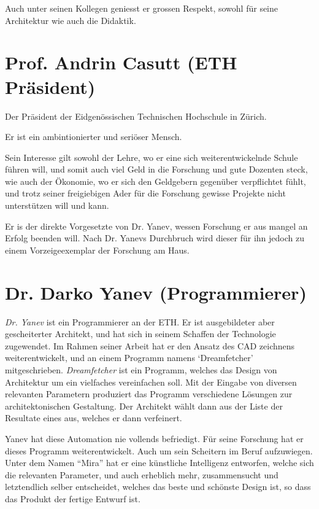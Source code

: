 \documentclass[11pt,a4paper,ngerman]{scrreprt}
\begin{document}
Auch unter seinen Kollegen geniesst er grossen Respekt, sowohl für seine
Architektur wie auch die Didaktik.

\section*{Prof. Andrin Casutt (ETH Präsident)}

Der Präsident der Eidgenössischen Technischen Hochschule in Zürich.

Er ist ein ambintionierter und seriöser Mensch.

Sein Interesse gilt sowohl der Lehre, wo er eine sich weiterentwickelnde Schule
führen will, und somit auch viel Geld in die Forschung und gute Dozenten steck,
wie auch der Ökonomie, wo er sich den Geldgebern gegenüber verpflichtet fühlt,
und trotz seiner freigiebigen Ader für die Forschung gewisse Projekte nicht
unterstützen will und kann.

Er is der direkte Vorgesetzte von Dr. Yanev, wessen Forschung er aus mangel an
Erfolg beenden will. Nach Dr. Yanevs Durchbruch wird dieser für ihn jedoch zu
einem Vorzeigeexemplar der Forschung am Haus.

\section*{Dr. Darko Yanev (Programmierer)}

\emph{Dr. Yanev} ist ein Programmierer an der ETH. Er ist ausgebildeter aber
gescheiterter Architekt, und hat sich in seinem Schaffen der Technologie
zugewendet. Im Rahmen seiner Arbeit hat er den Ansatz des CAD zeichnens
weiterentwickelt, und an einem Programm namens `Dreamfetcher'
mitgeschrieben. \emph{Dreamfetcher} ist ein Programm, welches das Design von
Architektur um ein vielfaches vereinfachen soll. Mit der Eingabe von diversen
relevanten Parametern produziert das Programm verschiedene Lösungen zur
architektonischen Gestaltung. Der Architekt wählt dann aus der Liste der
Resultate eines aus, welches er dann verfeinert.

Yanev hat diese Automation nie vollends befriedigt. Für seine Forschung hat er
dieses Programm weiterentwickelt. Auch um sein Scheitern im Beruf
aufzuwiegen. Unter dem Namen ``Mira'' hat er eine künstliche Intelligenz
entworfen, welche sich die relevanten Parameter, und auch erheblich mehr,
zusammensucht und letztendlich selber entscheidet, welches das beste und
schönste Design ist, so dass das Produkt der fertige Entwurf ist.
\end{document}
